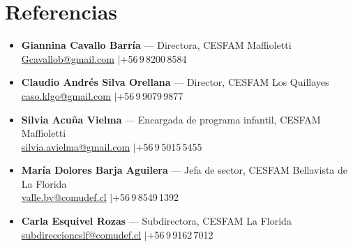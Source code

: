 \documentclass[11pt,a4paper]{article}
\begin{document}
\section{Referencias}
\begin{itemize}
  \item \textbf{Giannina Cavallo Barría} — Directora, CESFAM Maffioletti\\
        \href{mailto:Gcavallob@gmail.com}{Gcavallob@gmail.com} \quad$\vert$\quad +56\,9\,8200\,8584
  \item \textbf{Claudio Andrés Silva Orellana} — Director, CESFAM Los Quillayes\\
        \href{mailto:caso.klgo@gmail.com}{caso.klgo@gmail.com} \quad$\vert$\quad +56\,9\,9079\,9877
  \item \textbf{Silvia Acuña Vielma} — Encargada de programa infantil, CESFAM Maffioletti\\
        \href{mailto:silvia.avielma@gmail.com}{silvia.avielma@gmail.com} \quad$\vert$\quad +56\,9\,5015\,5455
  \item \textbf{María Dolores Barja Aguilera} — Jefa de sector, CESFAM Bellavista de La Florida\\
        \href{mailto:valle.bv@comudef.cl}{valle.bv@comudef.cl} \quad$\vert$\quad +56\,9\,8549\,1392
  \item \textbf{Carla Esquivel Rozas} — Subdirectora, CESFAM La Florida\\
        \href{mailto:subdireccioncslf@comudef.cl}{subdireccioncslf@comudef.cl} \quad$\vert$\quad +56\,9\,9162\,7012
\end{itemize}
\end{document}
